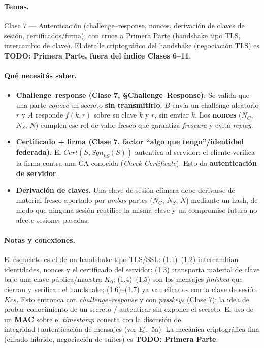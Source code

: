 \paragraph{Temas.}
Clase 7 — Autenticación (challenge--response, nonces, derivación de claves de sesión, certificados/firma);
con cruce a Primera Parte (handshake tipo TLS, intercambio de clave). El detalle criptográfico
del handshake (negociación TLS) es \textbf{TODO: Primera Parte, fuera del índice Clases 6--11}.

\paragraph{Qué necesitás saber.}
\begin{itemize}
\item \textbf{Challenge--response (Clase 7, \S Challenge--Response).} Se valida que una parte
      \emph{conoce} un secreto \textbf{sin transmitirlo}: $B$ envía un challenge aleatorio $r$ y
      $A$ responde $f(k,r)$ sobre su clave $k$ y $r$, sin enviar $k$. Los \textbf{nonces}
      ($N_C$, $N_S$, $N$) cumplen ese rol de valor fresco que garantiza \emph{frescura} y evita
      \emph{replay}.
\item \textbf{Certificado + firma (Clase 7, factor ``algo que tengo''/identidad federada).} El
      $\mathit{Cert}(S,\mathit{Sgn}_{kS}(S))$ autentica al servidor: el cliente verifica la firma
      contra una CA conocida (\emph{Check Certificate}). Esto da \textbf{autenticación de servidor}.
\item \textbf{Derivación de claves.} Una clave de sesión efímera debe derivarse de material fresco
      aportado por \emph{ambas} partes ($N_C$, $N_S$, $N$) mediante un hash, de modo que ninguna
      sesión reutilice la misma clave y un compromiso futuro no afecte sesiones pasadas.
\end{itemize}

\paragraph{Notas y conexiones.}
El esqueleto es el de un handshake tipo TLS/SSL: (1.1)--(1.2) intercambian identidades, nonces y
el certificado del servidor; (1.3) transporta material de clave bajo una clave pública/maestra
$K_0$; (1.4)--(1.5) son los mensajes \emph{finished} que cierran y verifican el handshake; (1.6)--(1.7)
ya van cifrados con la clave de sesión $Kcs$. Esto entronca con \emph{challenge--response} y con
\emph{passkeys} (Clase 7): la idea de probar conocimiento de un secreto / autenticar sin exponer el
secreto. El uso de un \textbf{MAC} sobre el \emph{timestamp} conecta con la discusión de
integridad+autenticación de mensajes (ver Ej.~5a). La mecánica criptográfica fina (cifrado híbrido,
negociación de suites) es \textbf{TODO: Primera Parte}.

